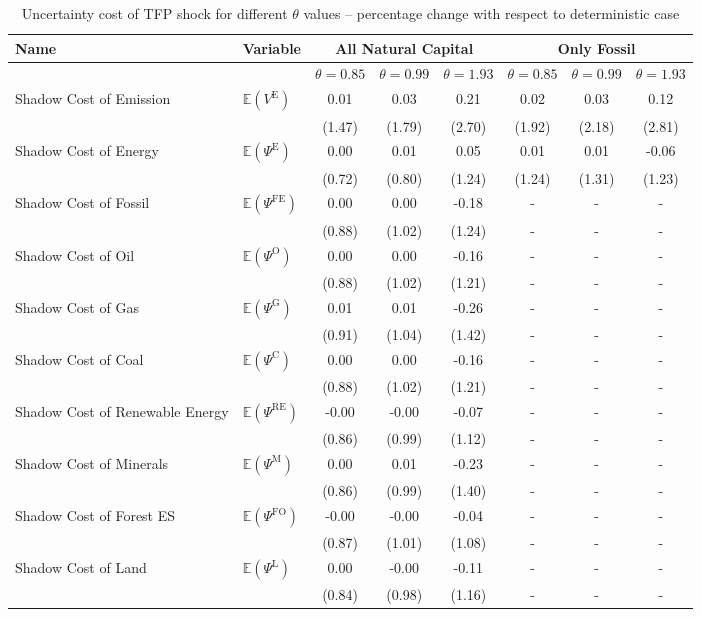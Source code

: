 \begin{table}[h!]
\centering
\begin{tabular}{l l c c c c c c}
\hline
Name & Variable & \multicolumn{3}{c}{All Natural Capital} & \multicolumn{3}{c}{Only Fossil} \\
\hline
 & & $\theta = 0.85$ & $\theta = 0.99$ & $\theta = 1.93$ & $\theta = 0.85$ & $\theta = 0.99$ & $\theta = 1.93$\\
\hline
Shadow Cost of Emission & $\mathbb{E}\!\left(V^{\text{E}}\right)$ & 0.01 & 0.03 & 0.21 & 0.02 & 0.03 & 0.12 \\
 & & (1.47) & (1.79) & (2.70) & (1.92) & (2.18) & (2.81) \\
Shadow Cost of Energy & $\mathbb{E}\!\left(\Psi^{\text{E}}\right)$ & 0.00 & 0.01 & 0.05 & 0.01 & 0.01 & -0.06 \\
 & & (0.72) & (0.80) & (1.24) & (1.24) & (1.31) & (1.23) \\
Shadow Cost of Fossil & $\mathbb{E}\!\left(\Psi^{\text{FE}}\right)$ & 0.00 & 0.00 & -0.18 & - & - & - \\
 & & (0.88) & (1.02) & (1.24) & - & - & - \\
Shadow Cost of Oil & $\mathbb{E}\!\left(\Psi^{\text{O}}\right)$ & 0.00 & 0.00 & -0.16 & - & - & - \\
 & & (0.88) & (1.02) & (1.21) & - & - & - \\
Shadow Cost of Gas & $\mathbb{E}\!\left(\Psi^{\text{G}}\right)$ & 0.01 & 0.01 & -0.26 & - & - & - \\
 & & (0.91) & (1.04) & (1.42) & - & - & - \\
Shadow Cost of Coal & $\mathbb{E}\!\left(\Psi^{\text{C}}\right)$ & 0.00 & 0.00 & -0.16 & - & - & - \\
 & & (0.88) & (1.02) & (1.21) & - & - & - \\
Shadow Cost of Renewable Energy & $\mathbb{E}\!\left(\Psi^{\text{RE}}\right)$ & -0.00 & -0.00 & -0.07 & - & - & - \\
 & & (0.86) & (0.99) & (1.12) & - & - & - \\
Shadow Cost of Minerals & $\mathbb{E}\!\left(\Psi^{\text{M}}\right)$ & 0.00 & 0.01 & -0.23 & - & - & - \\
 & & (0.86) & (0.99) & (1.40) & - & - & - \\
Shadow Cost of Forest ES & $\mathbb{E}\!\left(\Psi^{\text{FO}}\right)$ & -0.00 & -0.00 & -0.04 & - & - & - \\
 & & (0.87) & (1.01) & (1.08) & - & - & - \\
Shadow Cost of Land & $\mathbb{E}\!\left(\Psi^{\text{L}}\right)$ & 0.00 & -0.00 & -0.11 & - & - & - \\
 & & (0.84) & (0.98) & (1.16) & - & - & - \\
\hline
\end{tabular}
\caption{Uncertainty cost of TFP shock for different $\theta$ values -- percentage change with respect to deterministic case}
\label{tab:paper_table4}
\end{table}
